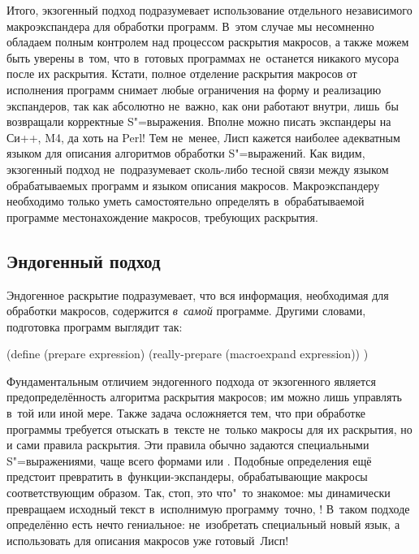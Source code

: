 Итого, экзогенный подход подразумевает использование отдельного независимого
макроэкспандера для обработки программ. В~этом случае мы несомненно обладаем
полным контролем над процессом раскрытия макросов, а также можем быть уверены
в~том, что в~готовых программах не~останется никакого мусора после их раскрытия.
Кстати, полное отделение раскрытия макросов от исполнения программ снимает любые
ограничения на форму и реализацию экспандеров, так как абсолютно не~важно, как
они работают внутри, лишь~бы возвращали корректные S"=выражения. Вполне можно
писать экспандеры на Си++, M4, да хоть на Perl! Тем не~менее, Лисп кажется
наиболее адекватным языком для описания алгоритмов обработки S"=выражений.
Как видим, экзогенный подход не~подразумевает сколь-либо тесной связи между
языком обрабатываемых программ и языком описания макросов. Макроэкспандеру
необходимо только уметь самостоятельно определять в~обрабатываемой программе
местонахождение макросов, требующих раскрытия.


\subsection{Эндогенный подход}\label{macros/expand/ssect:endo}

Эндогенное раскрытие подразумевает, что вся информация, необходимая для
обработки макросов, содержится \emph{в~самой} программе. Другими словами,
подготовка программ выглядит так:

\begin{code:lisp}
(define (prepare expression)
  (really-prepare (macroexpand expression)) )
\end{code:lisp}

Фундаментальным отличием эндогенного подхода от экзогенного является
предопределённость алгоритма раскрытия макросов; им можно лишь управлять в~той
или иной мере. Также задача осложняется тем, что при обработке программы
требуется отыскать в~тексте не~только макросы для их раскрытия, но и сами
правила раскрытия. Эти правила обычно задаются специальными S"=выражениями,
чаще всего формами  или . Подобные
определения ещё предстоит превратить в~функции-экспандеры, обрабатывающие
макросы соответствующим образом. Так, стоп, это что"~то знакомое: мы динамически
превращаем исходный текст в~исполнимую программу\textdots\ точно, !
В~таком подходе определённо есть нечто гениальное: не~изобретать специальный
новый язык, а использовать для описания макросов уже готовый~Лисп!

